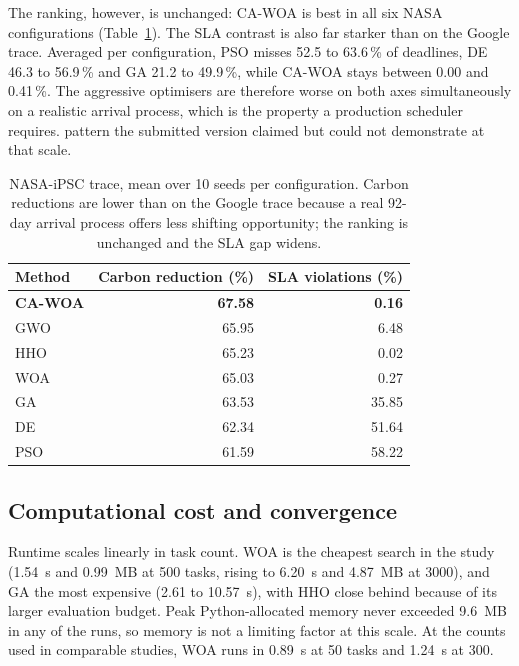 \documentclass[12pt,a4paper]{article}
\providecommand{\DIFaddtex}[1]{{\protect\color{blue} \sf #1}} %
\providecommand{\DIFdeltex}[1]{{\protect\color{red} \scriptsize #1}} %
\providecommand{\DIFaddbegin}{} %
\providecommand{\DIFaddend}{} %
\providecommand{\DIFdelbegin}{} %
\providecommand{\DIFdelend}{} %
\providecommand{\DIFadd}[1]{\texorpdfstring{\DIFaddtex{#1}}{#1}} %
\providecommand{\DIFdel}[1]{\texorpdfstring{\DIFdeltex{#1}}{}} %
\providecommand{\DIFscaledelfig}{0.5}
\newlength{\DIFdelgraphicswidth} %
\newlength{\DIFdelgraphicsheight} %
\providecommand{\DIFaddincludegraphics}[2][]{{\color{blue}\fbox{\DIFOincludegraphics[#1]{#2}}}} %
\providecommand{\DIFdelincludegraphics}[2][]{%
\sbox{\DIFdelgraphicsbox}{\DIFOincludegraphics[#1]{#2}}%
\settoboxwidth{\DIFdelgraphicswidth}{\DIFdelgraphicsbox} %
\settoboxtotalheight{\DIFdelgraphicsheight}{\DIFdelgraphicsbox} %
\scalebox{\DIFscaledelfig}{%
\parbox[b]{\DIFdelgraphicswidth}{\usebox{\DIFdelgraphicsbox}\\[-\baselineskip] \rule{\DIFdelgraphicswidth}{0em}}\llap{\resizebox{\DIFdelgraphicswidth}{\DIFdelgraphicsheight}{%
\setlength{\unitlength}{\DIFdelgraphicswidth}%
\begin{picture}(1,1)%
\thicklines\linethickness{2pt} %
{\color[rgb]{1,0,0}\put(0,0){\framebox(1,1){}}}%
{\color[rgb]{1,0,0}\put(0,0){\line( 1,1){1}}}%
{\color[rgb]{1,0,0}\put(0,1){\line(1,-1){1}}}%
\end{picture}%
}\hspace*{3pt}}} %
} %
\DeclareRobustCommand{\DIFaddbegin}{\DIFOaddbegin \let\includegraphics\DIFaddincludegraphics} %
\DeclareRobustCommand{\DIFaddend}{\DIFOaddend \let\includegraphics\DIFOincludegraphics} %
\DeclareRobustCommand{\DIFdelbegin}{\DIFOdelbegin \let\includegraphics\DIFdelincludegraphics} %
\DeclareRobustCommand{\DIFdelend}{\DIFOaddend \let\includegraphics\DIFOincludegraphics} %
\begin{document}
\DIFadd{The ranking, however, is unchanged: CA-WOA is best in all six NASA configurations
(Table~\ref{tab:nasa}). The SLA contrast is also far starker than on the Google
trace. Averaged per configuration, PSO misses 52.5 to 63.6\,\% of deadlines, DE 46.3
to 56.9\,\% and GA 21.2 to 49.9\,\%, while CA-WOA stays between 0.00 and 0.41\,\%.
The aggressive optimisers are therefore worse on both axes simultaneously on a
realistic arrival process, }\DIFaddend which is the \DIFdelbegin \DIFdel{property a production scheduler requires. }\DIFdelend \DIFaddbegin \DIFadd{pattern the submitted version claimed but
could not demonstrate at that scale.
}

\begin{table}[H]\centering\small
\caption{NASA-iPSC trace, mean over 10 seeds per configuration. Carbon reductions
are lower than on the Google trace because a real 92-day arrival process offers
less shifting opportunity; the ranking is unchanged and the SLA gap widens.}
\label{tab:nasa}
\begin{tabular}{lrr}
\toprule
Method & Carbon reduction (\%) & SLA violations (\%) \\
\midrule
\textbf{CA-WOA} & \textbf{67.58} & \textbf{0.16} \\
GWO             & 65.95 & 6.48 \\
HHO             & 65.23 & 0.02 \\
WOA             & 65.03 & 0.27 \\
GA              & 63.53 & 35.85 \\
DE              & 62.34 & 51.64 \\
PSO             & 61.59 & 58.22 \\
\bottomrule
\end{tabular}
\end{table}

\subsection{\DIFadd{Computational cost and convergence}}\label{sec:cost}
\DIFadd{Runtime scales linearly in task count. WOA is the cheapest search in the study (1.54~s and 0.99~MB at 500
tasks, rising to 6.20~s and 4.87~MB at 3000), and GA the most expensive (2.61 to 10.57~s), with HHO close
behind because of its larger evaluation budget. Peak Python-allocated memory never exceeded 9.6~MB in any of
the runs, so memory is not a limiting factor at this scale. At the counts used in comparable studies, WOA runs in
0.89~s at 50 tasks and 1.24~s at 300.
}
\end{document}
